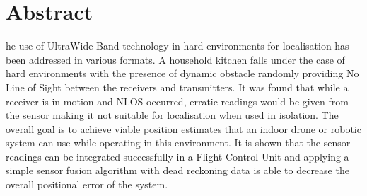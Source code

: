 %
%
%

\chapter*{Abstract}
\begin{SingleSpace}
he use of UltraWide Band technology in hard environments for localisation has been addressed in various formats.
    A household kitchen falls under the case of hard environments with the presence of dynamic obstacle randomly providing No Line of Sight between the receivers and transmitters.
    It was found that while a receiver is in motion and NLOS occurred, erratic readings would be given from the sensor making it not suitable for localisation when used in isolation.
    The overall goal is to achieve viable position estimates that an indoor drone or robotic system can use while operating in this environment.
    It is shown that the sensor readings can be integrated successfully in a Flight Control Unit and applying a simple sensor fusion algorithm with dead reckoning data is able to decrease the overall positional error of the system.
\end{SingleSpace}
\clearpage